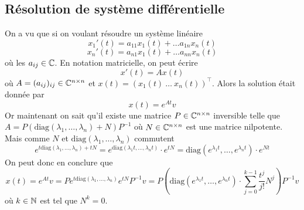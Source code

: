 \subsection{Résolution de système différentielle}
On a vu que si on voulant résoudre un système linéaire 
\[
x_1'(t) = a_{11} x_1(t) + \ldots a_{1n} x_n(t)
\]
\[
x_n'(t) = a_{n1} x_1(t) + \ldots a_{nn} x_n(t)
\]
où les $a_{ij} \in \mathbb C$. En notation matricielle, on peut écrire
\[
x'(t) = A x(t)
\]
où $A = (a_{ij})_{ij} \in \mathbb C^{n \times n}$ et $x(t) = (x_1(t) ~\ldots ~ x_n(t))^\top$. Alors la solution était donnée par
\[
x(t) = e^{At} v
\]
Or maintenant on sait qu'il existe une matrice $P \in \mathbb C^{n \times n}$ inversible telle que $A = P (\mathrm{diag}(\lambda_1, \ldots, \lambda_n) + N ) P^{-1}$ où $N \in \mathbb C^{n \times n}$ est une matrice nilpotente. Mais comme $N$ et $\mathrm{diag}(\lambda_1, \ldots, \lambda_n)$ commutent 
\[
e^{t\mathrm{diag}(\lambda_1, \ldots, \lambda_n) + tN} = e^{\mathrm{diag}(\lambda_1t, \ldots, \lambda_nt)} \cdot e^{tN} = \mathrm{diag}(e^{\lambda_1t}, \ldots, e^{\lambda_nt}) \cdot e^{Nt}
\]
On peut donc en conclure que
\[
x(t) = e^{At}v = Pe^{t \mathrm{diag}(\lambda_1, \ldots, \lambda_n)} e^{tN} P^{-1} v = P \left( \mathrm{diag}(e^{\lambda_1t}, \ldots, e^{\lambda_nt}) \cdot \sum_{j=0}^{k-1} \frac{t^j}{j!} N^j \right) P^{-1} v
\]
où $k \in \mathbb N$ est tel que $N^k = 0$.







